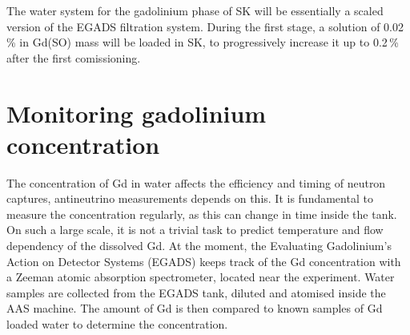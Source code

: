 The water system for the gadolinium phase of SK will be essentially a scaled version of the EGADS filtration system.
During the first stage, a solution of 0.02\,\% in Gd(SO) mass will be loaded in SK, %
to progressively increase it up to 0.2\,\% after the first comissioning.

\section{Monitoring gadolinium concentration}
\label{sec:gad}

The concentration of Gd in water affects the efficiency and timing of neutron captures, antineutrino measurements depends on this.
It is fundamental to measure the concentration regularly, as this can change in time inside the tank.
On such a large scale, it is not a trivial task to predict temperature and flow dependency of the dissolved Gd.
At the moment, the Evaluating Gadolinium's Action on Detector Systems (EGADS) keeps track of the Gd concentration
with a Zeeman atomic absorption spectrometer, located near the experiment.
Water samples are collected from the EGADS tank, diluted and atomised inside the AAS machine.
The amount of Gd is then compared to known samples of Gd loaded water to determine the concentration.

